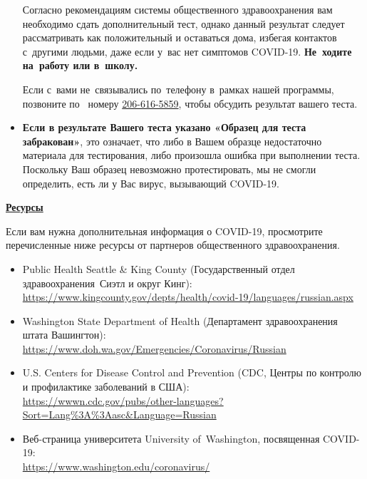 \documentclass[10pt]{article}
\begin{document}
\begin{itemize}
  Согласно рекомендациям системы общественного здравоохранения вам необходимо
  сдать дополнительный тест, однако данный результат следует рассматривать как
  положительный и оставаться дома, избегая контактов с другими людьми, даже если
  у вас нет симптомов COVID-19. \textbf{Не ходите на работу или в школу.}

  Если с вами не связывались по телефону в рамках нашей программы, позвоните по 
  номеру \href{tel:+1-206-616-5859}{206-616-5859}, чтобы обсудить результат вашего теста.

\item

  \textbf{Если в результате Вашего теста указано «Образец для теста
  забракован»}, это означает, что либо в Вашем образце недостаточно материала
  для тестирования, либо произошла ошибка при выполнении теста. Поскольку Ваш
  образец невозможно протестировать, мы не смогли определить, есть ли у Вас
  вирус, вызывающий COVID-19.

\end{itemize}

\bigskip

\large \underline{\textbf{Ресурсы}}

Если вам нужна дополнительная информация о COVID-19, просмотрите перечисленные
ниже ресурсы от партнеров общественного здравоохранения.

\begin{itemize}
\item
  Public Health \textemdash Seattle \& King County (Государственный отдел
  здравоохранения \textemdash Сиэтл и округ Кинг): \\
  \url{https://www.kingcounty.gov/depts/health/covid-19/languages/russian.aspx}

\item

  Washington State Department of Health (Департамент здравоохранения штата Вашингтон):\\
  \url{https://www.doh.wa.gov/Emergencies/Coronavirus/Russian}

\item
  U.S. Centers for Disease Control and Prevention (CDC, Центры по контролю и
  профилактике заболеваний в США):\\
  \url{https://wwwn.cdc.gov/pubs/other-languages?Sort=Lang%3A%3Aasc&Language=Russian}

\item
  Веб-страница университета University of Washington, посвященная COVID-19:\\
  \url{https://www.washington.edu/coronavirus/}

\end{itemize}
\end{document}
